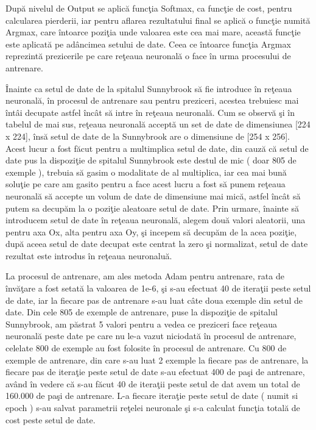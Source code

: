 \par

Dup\u{a} nivelul de Output se aplic\u{a} func\c{t}ia Softmax, ca func\c{t}ie de cost, pentru calcularea pierderii, iar pentru aflarea rezultatului final se aplic\u{a} o func\c{t}ie numit\u{a} Argmax, care \^{i}ntoarce pozi\c{t}ia unde valoarea este cea mai mare, aceast\u{a} func\c{t}ie este aplicat\u{a} pe ad\^{a}ncimea setului de date. Ceea ce \^{i}ntoarce func\c{t}ia Argmax reprezint\u{a} prezicerile pe care re\c{t}eaua neuronal\u{a} o face \^{i}n urma procesului de antrenare.

\par

\^{I}nainte ca setul de date de la spitalul Sunnybrook s\u{a} fie introduce \^{i}n re\c{t}eaua neuronal\u{a}, \^{i}n procesul de antrenare sau pentru preziceri, acestea trebuiesc mai \^{i}nt\^{a}i decupate astfel \^{i}nc\^{a}t s\u{a} intre \^{i}n re\c{t}eaua neuronal\u{a}. Cum se observ\u{a} \c{s}i \^{i}n tabelul de mai sus, re\c{t}eaua neuronal\u{a} accept\u{a} un set de date de dimensiunea [224 x 224], \^{i}ns\u{a} setul de date de la Sunnybrook are o dimensiune de [254 x 256]. Acest lucur a fost f\u{a}cut pentru a multimplica setul de date, din cauz\u{a} c\u{a} setul de date pus la dispozi\c{t}ie de spitalul Sunnybrook este destul de mic ( doar 805 de exemple ), trebuia s\u{a} gasim o modalitate de al multiplica, iar cea mai bun\u{a} solu\c{t}ie pe care am gasito pentru a face acest lucru a fost s\u{a} punem re\c{t}eaua neuronal\u{a} s\u{a} accepte un volum de date de dimensiune mai mic\u{a}, astfel \^{i}nc\^{a}t s\u{a} putem sa decup\u{a}m la o pozi\c{t}ie aleatoare setul de date. Prin urmare, \^{i}nainte s\u{a} introducem setul de date \^{i}n re\c{t}eaua neuronal\u{a}, alegem dou\u{a} valori aleatorii, una pentru axa Ox, alta pentru axa Oy, \c{s}i incepem s\u{a} decup\u{a}m de la acea pozi\c{t}ie, dup\u{a} aceea setul de date  decupat este centrat la zero \c{s}i normalizat, setul de date rezultat este introdus \^{i}n re\c{t}eaua neuronalu\u{a}.

\par

La procesul de antrenare,  am ales metoda Adam pentru antrenare, rata de \^{i}nv\u{a}\c{t}are a fost setat\u{a} la valoarea de 1e-6, \c{s}i s-au efectuat 40 de itera\c{t}ii peste setul de date, iar la fiecare pas de antrenare s-au luat c\^{a}te doua exemple din setul de date. Din cele 805 de exemple de antrenare, puse la dispozi\c{t}ie de spitalul Sunnybrook, am p\u{a}strat 5 valori pentru a vedea ce preziceri face re\c{t}eaua neuronal\u{a} peste date pe care nu le-a vazut niciodat\u{a} \^{i}n procesul de antrenare, celelate 800 de exemple au fost folosite \^{i}n procesul de antrenare. Cu 800 de exemple de antrenare, din care s-au luat 2 exemple la fiecare pas de antrenare, la fiecare pas de itera\c{t}ie peste setul de date s-au efectuat 400 de pa\c{s}i de antrenare, av\^{a}nd \^{i}n vedere c\u{a} s-au f\u{a}cut 40 de itera\c{t}ii peste setul de dat avem un total de 160.000 de pa\c{s}i de antrenare. L-a fiecare itera\c{t}ie peste setul de date ( numit si epoch ) s-au salvat parametrii re\c{t}elei neuronale \c{s}i s-a calculat func\c{t}ia total\u{a} de cost peste setul de date.

